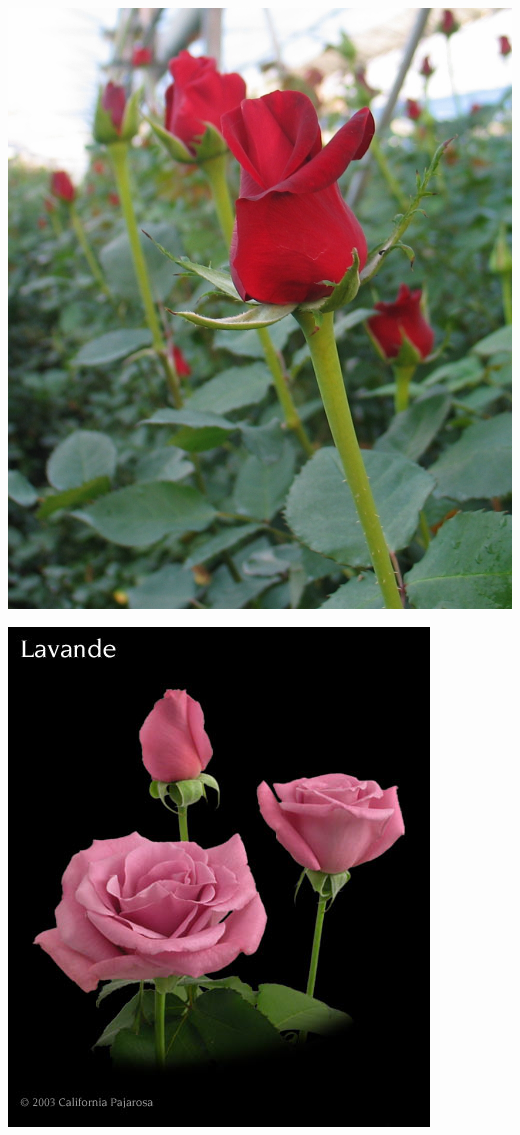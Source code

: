 \documentclass{article}
\begin{document}
\begin{center}
\includegraphics[width=0.9\textheight, angle=90]{../Rose_Kardinal.jpg}
\end{center}
\newpage

\begin{center}
\includegraphics[width=0.9\textheight, angle=90]{../Rose_Lavande.jpg}
\end{center}
\newpage
\end{document}
